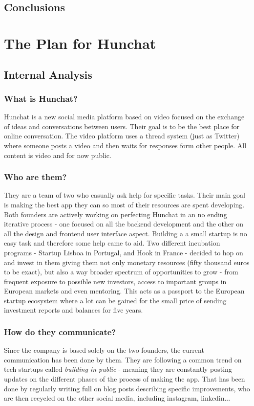 \documentclass[12pt]{article}
\begin{document}
\subsection{Conclusions}\label{meth:conclusions}

\section{The Plan for Hunchat}\label{plan}



\subsection{Internal Analysis}

	\subsubsection{What is Hunchat?}
Hunchat is a new social media platform based on video focused on the exchange of ideas and conversations between users. Their goal is to be the best place for online conversation. The video platform uses a thread system (just as Twitter) where someone posts a video and then waits for responses form other people. All content is video and for now public.

	\subsubsection{Who are them?}
They are a team of two who casually ask help for specific tasks. Their main goal is making the best app they can so most of their resources are spent developing. Both founders are actively working on perfecting Hunchat in an no ending iterative process - one focused on all the backend development and the other on all the design and frontend user interface aspect. Building a a small startup is no easy task and therefore some help came to aid. Two different incubation programs - Startup Lisboa in Portugal, and Hook in France - decided to hop on and invest in them giving them not only monetary resources (fifty thousand euros to be exact), but also a way broader spectrum of opportunities to grow - from frequent exposure to possible new investors, access to important groups in European markets and even mentoring. This acts as a passport to the European startup ecosystem where a lot can be gained for the small price of sending investment reports and balances for five years.

	\subsubsection{How do they communicate?}
Since the company is based solely on the two founders, the current communication has been done by them. They are following a common trend on tech startups called \textit{building in public} - meaning they are constantly posting updates on the different phases of the process of making the app. That has been done by regularly writing full on blog posts describing specific improvements, who are then recycled on the other social media, including instagram, linkedin...
\end{document}
